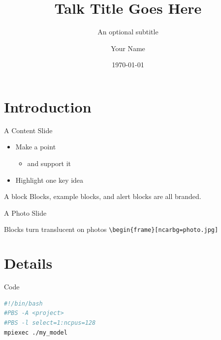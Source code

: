 \documentclass[aspectratio=169]{beamer}
\title{Talk Title Goes Here}
\subtitle{An optional subtitle}
\author{Your Name}
\institute{Your Title, Your Lab, NSF NCAR}
\date{\today}
\begin{document}
\begin{frame}
  \titlepage
\end{frame}

\section{Introduction}

\begin{frame}{A Content Slide}
  \begin{itemize}
  \item Make a point
    \begin{itemize}
    \item and support it
    \end{itemize}
  \item Highlight \alert{one key idea}
  \end{itemize}
  \begin{block}{A block}
    Blocks, example blocks, and alert blocks are all branded.
  \end{block}
\end{frame}

\begin{frame}[ncarbg=images/wallpaper/mesa_lab.jpg]{A Photo Slide}
  \vfill
  \begin{block}{Blocks turn translucent on photos}
    \texttt{\textbackslash begin\{frame\}[ncarbg=photo.jpg]}
  \end{block}
\end{frame}

\section{Details}

\begin{frame}[fragile]{Code}
\begin{lstlisting}[language=bash]
#!/bin/bash
#PBS -A <project>
#PBS -l select=1:ncpus=128
mpiexec ./my_model
\end{lstlisting}
\end{frame}

\end{document}
